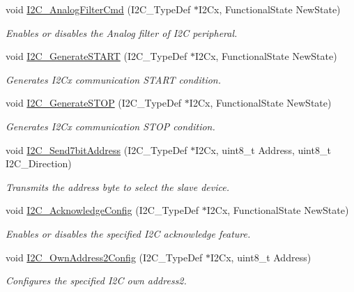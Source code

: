 \begin{DoxyCompactItemize}
void \mbox{\hyperlink{group___i2_c_ga7f92bbdb33774b819232d039c73bf1c2}{I2\+C\+\_\+\+Analog\+Filter\+Cmd}} (I2\+C\+\_\+\+Type\+Def $\ast$I2\+Cx, Functional\+State New\+State)
\begin{DoxyCompactList}\small\item\em Enables or disables the Analog filter of I2C peripheral. \end{DoxyCompactList}\item 
void \mbox{\hyperlink{group___i2_c_ga36c522b471588be9779c878222ccb20f}{I2\+C\+\_\+\+Generate\+S\+T\+A\+RT}} (I2\+C\+\_\+\+Type\+Def $\ast$I2\+Cx, Functional\+State New\+State)
\begin{DoxyCompactList}\small\item\em Generates I2\+Cx communication S\+T\+A\+RT condition. \end{DoxyCompactList}\item 
void \mbox{\hyperlink{group___i2_c_ga5c92cb573ca0ae58cc465e5400246561}{I2\+C\+\_\+\+Generate\+S\+T\+OP}} (I2\+C\+\_\+\+Type\+Def $\ast$I2\+Cx, Functional\+State New\+State)
\begin{DoxyCompactList}\small\item\em Generates I2\+Cx communication S\+T\+OP condition. \end{DoxyCompactList}\item 
void \mbox{\hyperlink{group___i2_c_ga009fc2a5b2313c36da39ece39a1156a6}{I2\+C\+\_\+\+Send7bit\+Address}} (I2\+C\+\_\+\+Type\+Def $\ast$I2\+Cx, uint8\+\_\+t Address, uint8\+\_\+t I2\+C\+\_\+\+Direction)
\begin{DoxyCompactList}\small\item\em Transmits the address byte to select the slave device. \end{DoxyCompactList}\item 
void \mbox{\hyperlink{group___i2_c_ga7bb44e894d68a7991f564c43fb187486}{I2\+C\+\_\+\+Acknowledge\+Config}} (I2\+C\+\_\+\+Type\+Def $\ast$I2\+Cx, Functional\+State New\+State)
\begin{DoxyCompactList}\small\item\em Enables or disables the specified I2C acknowledge feature. \end{DoxyCompactList}\item 
void \mbox{\hyperlink{group___i2_c_ga7be2cc634a613c8e3539137e897a22df}{I2\+C\+\_\+\+Own\+Address2\+Config}} (I2\+C\+\_\+\+Type\+Def $\ast$I2\+Cx, uint8\+\_\+t Address)
\begin{DoxyCompactList}\small\item\em Configures the specified I2C own address2. \end{DoxyCompactList}\item 

\end{DoxyCompactItemize}

